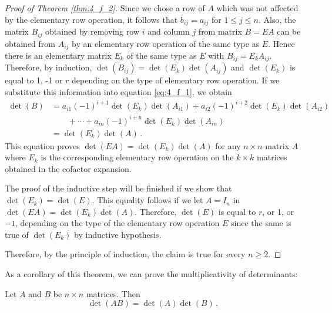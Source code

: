\begin{proof}[Proof of Theorem \ref{thm:4_f_2}]
Since we chose a row of $A$ which was not affected by the elementary row operation, it follows that $b_{ij}=a_{ij}$ for $1\leq j\leq n$. Also, the matrix $B_{ij}$ obtained by removing row $i$ and column $j$ from matrix $B=EA$ can be obtained from $A_{ij}$ by an elementary row operation of the same type as $E$. Hence there is an elementary matrix $E_k$ of the same type as $E$ with $B_{ij}=E_k A_{ij}$. Therefore, by induction, $\det(B_{ij})=\det(E_k)\det(A_{ij})$ and $\det(E_k)$ is equal to 1, -1 or $r$ depending on the type of elementary row operation. If we substitute this information into equation \eqref{eq:4_f_1}, we obtain
\begin{equation*}
\begin{split}
\det(B)&= a_{i1} (-1)^{i+1} \det(E_k) \det(A_{i1}) + a_{i2} (-1)^{i+2} \det(E_k) \det(A_{i2}) \\
	&\qquad + \cdots + a_{in} (-1)^{i+n} \det(E_k) \det(A_{in})\\
	&= \det(E_k) \det(A) \, . 
\end{split}
\end{equation*}
This equation proves $\det(EA)=\det(E_k)\det(A)$ for any $n\times n$ matrix $A$ where $E_k$ is the corresponding elementary row operation on the $k\times k$ matrices obtained in the cofactor expansion.

The proof of the inductive step will be finished if we show that $\det(E_k)=\det(E)$. This equality follows if we let $A=I_n$ in $\det(EA)=\det(E_k)\det(A)$. Therefore, $\det(E)$ is equal to $r$, or 1, or $-1$, depending on the type of the elementary row operation $E$ since the same is true of $\det(E_k)$ by inductive hypothesis.

Therefore, by the principle of induction, the claim is true for every $n\geq 2$.
\end{proof}



As a corollary of this theorem, we can prove the multiplicativity of determinants:



\begin{theorem} \label{thm:determinant_product} Let $A$ and $B$ be $n\times n$ matrices. Then
\[ \det(AB)=\det(A)\det(B) \,.\]
\end{theorem}

